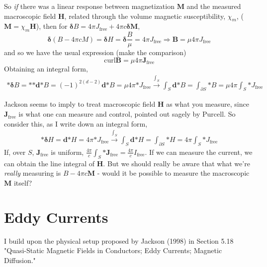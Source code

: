 \documentclass[10pt]{amsart}
\begin{document}
\begin{multicols*}{2}
So \emph{if} there was a linear response between magnetization $\mathbf{M}$ and the measured macroscopic field $\mathbf{H}$, related through the volume magnetic susceptibility, $\chi_m$, ($\mathbf{M} = \chi_m \mathbf{H}$), then for $\mathbf{\delta} B = 4\pi J_{\text{free}} + 4\pi c \mathbf{\delta} \mathbf{M}$, 
\[
\mathbf{\delta} (B-4\pi c M) = \mathbf{\delta} H = \mathbf{\delta} \frac{ B}{ \mu } = 4\pi J_{\text{free}} \Longrightarrow \mathbf{B} = \mu 4\pi J_{\text{free}} 
\]
and so we have the usual expression (make the comparison)
\[
\text{curl} \mathbf{B} = \mu 4\pi \mathbf{J}_{\text{free}}
\]
Obtaining an integral form, 
\[
\begin{gathered}
	\mathbf{*} \mathbf{\delta} B = \mathbf{*} \mathbf{*} \mathbf{d} \mathbf{*} B = (-1)^{2(d-2)} \mathbf{d}\mathbf{*} B = \mu 4\pi \mathbf{*} J_{\text{free}} \xrightarrow{ \int_S } \int_S \mathbf{d} \mathbf{*} B =  \int_{\partial S} \mathbf{*} B = \mu 4\pi \int_S \mathbf{*} J_{\text{free}}
\end{gathered}
\]

Jackson seems to imply to treat macroscopic field $\mathbf{H}$ as what you measure, since $\mathbf{J}_{\text{free}}$ is what one can measure and control, pointed out sagely by Purcell.  So consider this, as I write down an integral form,
\[
\begin{gathered}
\mathbf{*} \mathbf{\delta} H  = \mathbf{d} \mathbf{*} H = 4\pi \mathbf{*} J_{\text{free}} \xrightarrow{ \int_S } \int_S \mathbf{d} \mathbf{*} H = \int_{\partial S} \mathbf{*} H = 4\pi \int_S \mathbf{*} J_{\text{free}}
\end{gathered}
\]
If, over $S$, $\mathbf{J}_{\text{free}}$ is uniform, $\frac{4\pi}{c} \int_S \mathbf{*} \mathbf{J}_{\text{free}} = \frac{4\pi }{c} I_{\text{free}}$.  If we can measure the current, we can obtain the line integral of $\mathbf{H}$.  But we should really be aware that what we're \emph{really} measuring is $B-4\pi c \mathbf{M}$ - would it be possible to measure the macroscopic $\mathbf{M}$ itself?

\section{Eddy Currents}

I build upon the physical setup proposed by Jackson (1998) \cite{Jack1998} in Section 5.18 "Quasi-Static Magnetic Fields in Conductors; Eddy Currents; Magnetic Diffusion."   


\end{multicols*}
\end{document}
